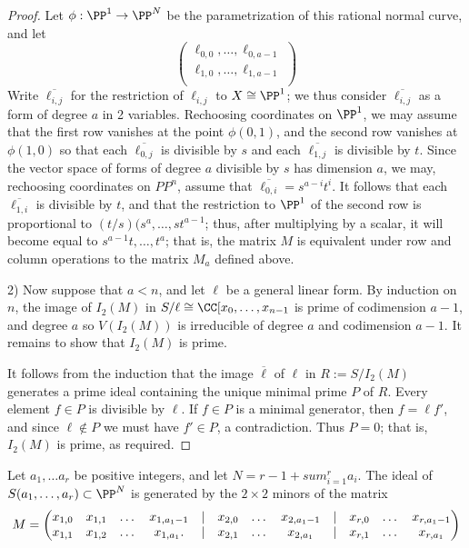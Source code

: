 \begin{proof}
Let $\phi: \PP^{1}\to \PP^{N}$ be the parametrization of this rational normal curve, and let
$$
\begin{pmatrix}
 \ell_{0,0},\dots, \ell_{0,a-1}\\
  \ell_{1,0},\dots, \ell_{1,a-1}\\
\end{pmatrix}
$$
 Write $\overline{\ell_{i,j}}$ for the restriction of $\ell_{i,j}$ to $X \cong \PP^{1}$; we thus consider
  $\overline{\ell_{i,j}}$ as a form of degree $a$ in 2 variables. 
 Rechoosing coordinates on $\PP^{1}$, we may assume that the first row vanishes at the point $\phi(0,1)$, and the second row vanishes at $\phi(1,0)$ so that each $\overline{\ell_{0,j}}$ is divisible by $s$ and each $\overline{\ell_{1,j}}$ is divisible by $t$. Since the vector space of forms of degree $a$ divisible by $s$ has dimension $a$, we may, rechoosing coordinates on $PP^{n}$, assume that $\overline{\ell_{0,i}} = s^{a-i}t^{i}$. It follows that
each $\overline{\ell_{1,i}}$ is divisible by $t$, and that the restriction to $\PP^{1}$ of the second
row is proportional to $(t/s)(s^{a},\dots,st^{a-1}$; thus, after multiplying by a scalar, it will become
equal to $s^{a-1}t,\dots,t^{a}$; that is, the matrix $M$ is equivalent under row and column operations to the matrix $M_{a}$ defined above.

2) Now suppose that $a<n$, and let $\ell$ be a general linear form. By induction on $n$, the image of $I_{2}(M)$ in $S/\ell \cong \CC[x_{0},\dots, x_{n-1}$ is prime of codimension $a-1$, and degree $a$ so
$V(I_{2}(M))$ is irreducible of degree $a$ and codimension $a-1$. It remains to show
that $I_{2}(M)$ is prime.

It follows from the induction that the image $\overline \ell$ of $\ell$ in
$R :=  S/I_{2}(M)$  generates a prime ideal containing the
unique minimal prime $P$ of $R$. 
Every element $f\in P$ is divisible by $\ell$. If $f\in P$ is a minimal generator, then $f = \ell f'$, and
since $\ell\notin P$ we must have $f'\in P$, a contradiction. Thus $P = 0$; that is, $I_{2}(M)$ is
prime, as required.
\end{proof}

\begin{corollary}\label{equations of scrolls} Let $a_{1}, \dots a_{r}$ be positive integers, and let $N = r-1+sum_{i=1}^{r} a_{i}$.
The ideal of $S(a_{1},\dots,a_{r})\subset \PP^{N}$ is generated by the $2\times 2$ minors of the matrix
$$
\setcounter{MaxMatrixCols}{20}
M = \begin{pmatrix}
x_{1,0}&x_{1,1}&\dots&x_{1, a_{1}-1}&|&x_{2,0}&\dots&x_{2, a_{1}-1}&|&x_{r,0}&\dots&x_{r, a_{1}-1}\\
x_{1,1}&x_{1,2}&\dots&x_{1, a_{1}}.  &|&x_{2,1}&\dots&x_{2, a_{1}}&|&x_{r,1}&\dots&x_{r, a_{1}}
\end{pmatrix}
$$
\end{corollary}


